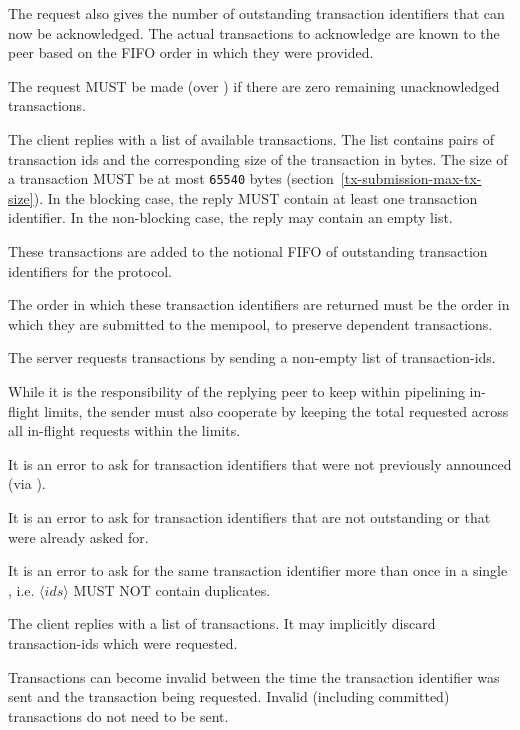 \begin{description}
      The request also gives the number of outstanding transaction identifiers
      that can now be acknowledged. The actual transactions to acknowledge are
      known to the peer based on the FIFO order in which they were provided.

      The request MUST be made (over \MsgRequestTxIdsB{}) if there are zero
      remaining unacknowledged transactions.
\item [\MsgReplyTxIds{} {\boldmath ($\langle (id, size) \rangle$) }]
      The client replies with a list of available transactions.
      The list contains pairs of transaction ids and the corresponding size of the transaction in bytes.
      The size of a transaction MUST be at most \texttt{65540} bytes
      (section~\ref{tx-submission-max-tx-size}).
      In the blocking case, the reply MUST contain at least one transaction identifier.
      In the non-blocking case, the reply may contain an empty list.

      These transactions are added to the notional FIFO of outstanding
      transaction identifiers for the protocol.

      The order in which these transaction identifiers are returned must be the
      order in which they are submitted to the mempool, to preserve dependent
      transactions.
\item [\MsgRequestTxs{} {\boldmath ($\langle ids \rangle$)}]
      The server requests transactions by sending a non-empty list of transaction-ids.

      While it is the responsibility of the replying peer to keep within
      pipelining in-flight limits, the sender must also cooperate by keeping
      the total requested across all in-flight requests within the limits.

      It is an error to ask for transaction identifiers that were not
      previously announced (via \MsgReplyTxIds{}).

      It is an error to ask for transaction identifiers that are not
      outstanding or that were already asked for.

      It is an error to ask for the same transaction identifier more than
      once in a single \MsgRequestTxs{}, i.e. $\langle ids \rangle$ MUST NOT
      contain duplicates.
\item [\MsgReplyTxs{} {\boldmath ($\langle txs \rangle$})]
      The client replies with a list of transactions.  It may implicitly
      discard transaction-ids which were requested.

      Transactions can become invalid between the time the transaction
      identifier was sent and the transaction being requested. Invalid
      (including committed) transactions do not need to be sent.


\end{description}

